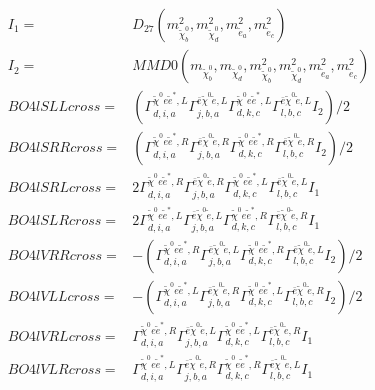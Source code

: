 \documentclass[A4,landscape]{article}
\begin{document}
\begin{align} 
I_1 = & D_{27}(m^2_{\tilde{\chi}^0_{{b}}}, m^2_{\tilde{\chi}^0_{{d}}}, m^2_{\tilde{e}_{{a}}}, m^2_{\tilde{e}_{{c}}}) \\ 
I_2 = & MMD0(m_{\tilde{\chi}^0_{{b}}}, m_{\tilde{\chi}^0_{{d}}}, m^2_{\tilde{\chi}^0_{{b}}}, m^2_{\tilde{\chi}^0_{{d}}}, m^2_{\tilde{e}_{{a}}}, m^2_{\tilde{e}_{{c}}}) \\ 
  BO4lSLLcross= & ( \Gamma^{\tilde{\chi}^0 e \tilde{e}^*,L}_{d, i, a} \Gamma^{\bar{e}\tilde{\chi}^0 \tilde{e} ,L}_{j, b, a} \Gamma^{\tilde{\chi}^0 e \tilde{e}^*,L}_{d, k, c} \Gamma^{\bar{e}\tilde{\chi}^0 \tilde{e} ,L}_{l, b, c} I_2)/2 \\ 
  BO4lSRRcross= & ( \Gamma^{\tilde{\chi}^0 e \tilde{e}^*,R}_{d, i, a} \Gamma^{\bar{e}\tilde{\chi}^0 \tilde{e} ,R}_{j, b, a} \Gamma^{\tilde{\chi}^0 e \tilde{e}^*,R}_{d, k, c} \Gamma^{\bar{e}\tilde{\chi}^0 \tilde{e} ,R}_{l, b, c} I_2)/2 \\ 
  BO4lSRLcross= & 2  \Gamma^{\tilde{\chi}^0 e \tilde{e}^*,R}_{d, i, a} \Gamma^{\bar{e}\tilde{\chi}^0 \tilde{e} ,R}_{j, b, a} \Gamma^{\tilde{\chi}^0 e \tilde{e}^*,L}_{d, k, c} \Gamma^{\bar{e}\tilde{\chi}^0 \tilde{e} ,L}_{l, b, c} I_1 \\ 
  BO4lSLRcross= & 2  \Gamma^{\tilde{\chi}^0 e \tilde{e}^*,L}_{d, i, a} \Gamma^{\bar{e}\tilde{\chi}^0 \tilde{e} ,L}_{j, b, a} \Gamma^{\tilde{\chi}^0 e \tilde{e}^*,R}_{d, k, c} \Gamma^{\bar{e}\tilde{\chi}^0 \tilde{e} ,R}_{l, b, c} I_1 \\ 
  BO4lVRRcross= & -( \Gamma^{\tilde{\chi}^0 e \tilde{e}^*,R}_{d, i, a} \Gamma^{\bar{e}\tilde{\chi}^0 \tilde{e} ,L}_{j, b, a} \Gamma^{\tilde{\chi}^0 e \tilde{e}^*,R}_{d, k, c} \Gamma^{\bar{e}\tilde{\chi}^0 \tilde{e} ,L}_{l, b, c} I_2)/2 \\ 
  BO4lVLLcross= & -( \Gamma^{\tilde{\chi}^0 e \tilde{e}^*,L}_{d, i, a} \Gamma^{\bar{e}\tilde{\chi}^0 \tilde{e} ,R}_{j, b, a} \Gamma^{\tilde{\chi}^0 e \tilde{e}^*,L}_{d, k, c} \Gamma^{\bar{e}\tilde{\chi}^0 \tilde{e} ,R}_{l, b, c} I_2)/2 \\ 
  BO4lVRLcross= &  \Gamma^{\tilde{\chi}^0 e \tilde{e}^*,R}_{d, i, a} \Gamma^{\bar{e}\tilde{\chi}^0 \tilde{e} ,L}_{j, b, a} \Gamma^{\tilde{\chi}^0 e \tilde{e}^*,L}_{d, k, c} \Gamma^{\bar{e}\tilde{\chi}^0 \tilde{e} ,R}_{l, b, c} I_1 \\ 
  BO4lVLRcross= &  \Gamma^{\tilde{\chi}^0 e \tilde{e}^*,L}_{d, i, a} \Gamma^{\bar{e}\tilde{\chi}^0 \tilde{e} ,R}_{j, b, a} \Gamma^{\tilde{\chi}^0 e \tilde{e}^*,R}_{d, k, c} \Gamma^{\bar{e}\tilde{\chi}^0 \tilde{e} ,L}_{l, b, c} I_1 \\ 

\end{align}
\end{document}
